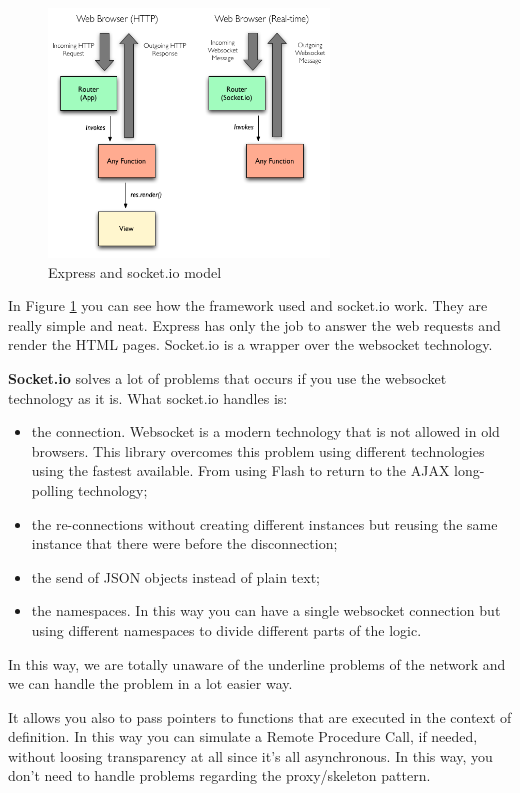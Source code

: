\begin{figure}[H]
\centering %
\includegraphics[height=250px]{img/express.png}
\caption{Express and socket.io model}
\label{fig:expressSocketio}
\end{figure}

In Figure \ref{fig:expressSocketio} you can see how the framework used and socket.io work. They are really simple and neat. Express has only the job to answer the web requests and render the HTML pages. Socket.io is a wrapper over the websocket technology.

\textbf{Socket.io} solves a lot of problems that occurs if you use the websocket technology as it is. What socket.io handles is:
\begin{itemize}
\item the connection. Websocket is a modern technology that is not allowed in old browsers. This library overcomes this problem using different technologies using the fastest available. From using Flash to return to the AJAX long-polling technology;
\item the re-connections without creating different instances but reusing the same instance that there were before the disconnection;
\item the send of JSON objects instead of plain text;
\item the namespaces. In this way you can have a single websocket connection but using different namespaces to divide different parts of the logic.
\end{itemize}

In this way, we are totally unaware of the underline problems of the network and we can handle the problem in a lot easier way.

It allows you also to pass pointers to functions that are executed in the context of definition. In this way you can simulate a Remote Procedure Call, if needed, without loosing transparency at all since it's all asynchronous. In this way, you don't need to handle problems regarding the proxy/skeleton pattern.

